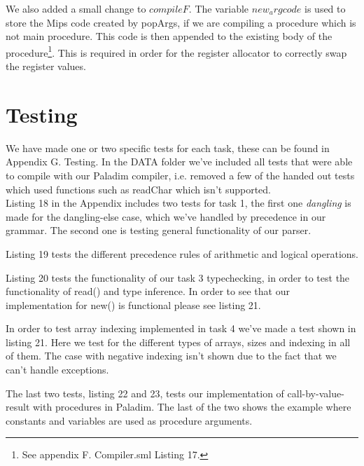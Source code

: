 \documentclass[12pt,a4paper,english]{article}
\begin{document}
We also added a small change to $compileF$. The variable $new_argcode$ is used to store the Mips code created by popArgs, if we are compiling a procedure which is not main procedure. This code is then appended to the existing body of the procedure\footnote{See appendix F. Compiler.sml Listing 17.}. This is required in order for the register allocator to correctly swap the register values. 

\newpage
\section{Testing}
We have made one or two specific tests for each task, these can be found in Appendix G. Testing. In the DATA folder we've included all tests that were able to compile with our Paladim compiler, i.e. removed a few of the handed out tests which used functions such as readChar which isn't supported.\\

Listing 18 in the Appendix includes two tests for task 1, the first one \textit{dangling} is made for the dangling-else case, which we've handled by precedence in our grammar. The second one is testing general functionality of our parser.

Listing 19 tests the different precedence rules of arithmetic and logical operations.

Listing 20 tests the functionality of our task 3 typechecking, in order to test the functionality of read() and type inference. In order to see that our implementation for new() is functional please see listing 21.

In order to test array indexing implemented in task 4 we've made a test shown in listing 21. Here we test for the different types of arrays, sizes and indexing in all of them. The case with negative indexing isn't shown due to the fact that we can't handle exceptions.

The last two tests, listing 22 and 23, tests our implementation of call-by-value-result with procedures in Paladim. The last of the two shows the example where constants and variables are used as procedure arguments.

\newpage
\end{document}
